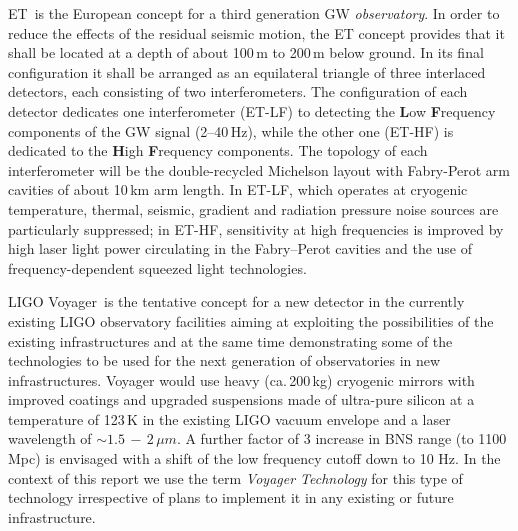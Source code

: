 \begin{tcolorbox}[standard jigsaw,colback=amber!10!white,colframe=red!70!black,coltext=black, title=The Einstein gravitational--wave Telescope (ET)] ET\,\cite{ET2011} is the European concept for a third generation GW \emph{observatory}. In order to reduce the effects of the residual seismic motion, the ET concept provides that it shall be located at a depth of about 100\,m to 200\,m below ground. In its final configuration it shall be arranged as an equilateral triangle of three interlaced detectors, each consisting of two interferometers. The configuration of each detector dedicates one interferometer (ET-LF) to detecting the \textbf{L}ow \textbf{F}requency components of the GW signal (2--40\,Hz), while the other one (ET-HF) is dedicated to the \textbf{H}igh \textbf{F}requency components. The topology of each interferometer will be the double-recycled Michelson layout with Fabry-Perot arm cavities of about 10\,km arm length. In ET-LF, which operates at cryogenic temperature, thermal, seismic, gradient and radiation pressure noise sources are particularly suppressed; in ET-HF, sensitivity at high frequencies is improved by high laser light power circulating in the Fabry--Perot cavities and the use of frequency-dependent squeezed light technologies.
\end{tcolorbox}



\begin{tcolorbox}[standard jigsaw,colframe=azure!70!black,colback=azure!20!white,opacityback=0.6,coltext=black, title= LIGO Voyager]
LIGO Voyager\,\cite{Voyager:Inst,VoyagerDCC2018} is the tentative concept for a new detector in the currently existing LIGO observatory facilities aiming at exploiting the possibilities of the existing infrastructures and at the same time demonstrating some of the technologies to be used for the next generation of observatories in new infrastructures.
Voyager would use heavy (ca.\,200\,kg) cryogenic mirrors with improved coatings and upgraded suspensions made of ultra-pure silicon at a temperature of 123\,K in the existing LIGO vacuum envelope and a laser wavelength of $\sim1.5\,-\,2\,\mu m$. 
A further factor of 3 increase in BNS range (to 1100\,Mpc) is envisaged with a shift of the low frequency cutoff down to 10 Hz. In the context of this report we use the term \emph{Voyager Technology} for this type of technology irrespective of plans to implement it in any existing or future infrastructure.
\end{tcolorbox}

